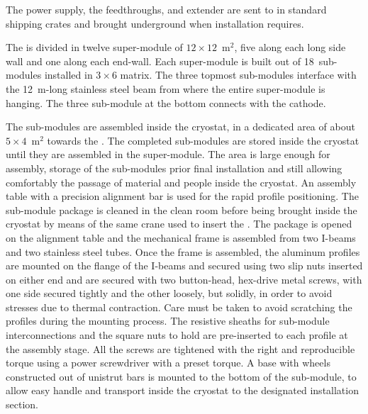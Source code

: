 The power supply, the  feedthroughs, and  extender are sent to  in standard shipping crates and brought underground when installation requires.

The  is divided in twelve super-module of $12\times12$~m$^2$, five along each long side wall and one along each end-wall.
Each super-module is built out of 18~sub-modules installed in $3 \times 6$ matrix.
The three topmost sub-modules interface with the 12~m-long stainless steel beam from where the entire super-module is hanging.
The three sub-module at the bottom connects with the cathode.

The  sub-modules are assembled inside the  cryostat, in a dedicated area of about $5 \times 4$~m$^2$ towards the .
The completed sub-modules are stored inside the cryostat until they are assembled in the super-module.
The area is large enough for assembly, storage of the sub-modules prior final installation and still allowing comfortably the passage of material and people inside the cryostat.
An assembly table with a precision alignment bar is used for the rapid profile positioning.
The sub-module package is cleaned in the clean room before being brought inside the cryostat by means of the same crane used to insert the .
The package is opened on the alignment table and the mechanical frame is assembled from two  I-beams and two stainless steel tubes.
Once the frame is assembled, the aluminum profiles are mounted on the flange of the  I-beams and secured using two slip nuts inserted on either end and are secured with two button-head, hex-drive metal screws, with one side secured tightly and the other loosely, but solidly, in order to avoid stresses due to thermal contraction.
Care must be taken to avoid scratching the profiles during the mounting process.
The resistive sheaths for sub-module interconnections and the square nuts to hold  are pre-inserted to each profile at the assembly stage.
All the screws are tightened with the right and reproducible torque using a power screwdriver with a preset torque.
A base with wheels constructed out of unistrut bars is mounted to the bottom of the sub-module, to allow easy handle and transport inside the cryostat to the designated installation section.

